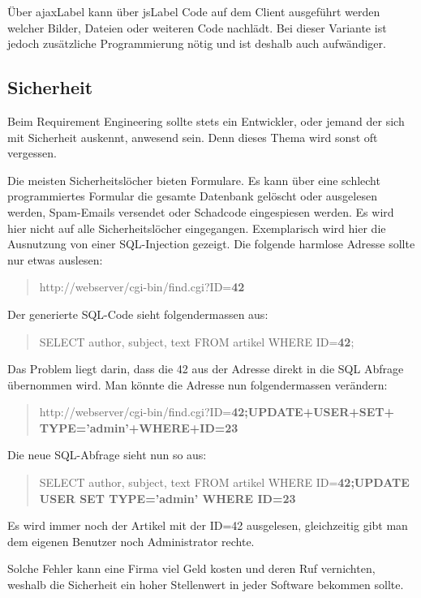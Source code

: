Über \gls{ajaxLabel} kann über \gls{jsLabel} Code auf dem Client ausgeführt werden welcher Bilder, Dateien oder weiteren Code nachlädt. Bei dieser Variante ist jedoch zusätzliche Programmierung nötig und ist deshalb auch aufwändiger. 

\subsection{Sicherheit}
Beim Requirement Engineering sollte stets ein Entwickler, oder jemand der sich mit Sicherheit auskennt, anwesend sein. Denn dieses Thema wird sonst oft vergessen.

Die meisten Sicherheitslöcher bieten Formulare. Es kann über eine schlecht programmiertes Formular die gesamte Datenbank gelöscht oder ausgelesen werden, Spam-Emails versendet oder Schadcode eingespiesen werden.
Es wird hier nicht auf alle Sicherheitslöcher eingegangen. Exemplarisch wird hier die Ausnutzung von einer SQL-Injection gezeigt. Die folgende harmlose Adresse sollte nur etwas auslesen:

\begin{quote}
http://webserver/cgi-bin/find.cgi?ID=\textbf{42}
\end{quote}

Der generierte SQL-Code sieht folgendermassen aus:

\begin{quote}
SELECT author, subject, text FROM artikel WHERE ID=\textbf{42};
\end{quote}

Das Problem liegt darin, dass die 42 aus der Adresse direkt in die SQL Abfrage übernommen wird. Man könnte die Adresse nun folgendermassen verändern:

\begin{quote}
http://webserver/cgi-bin/find.cgi?ID=\textbf{42;UPDATE+USER+SET+\\
TYPE='admin'+WHERE+ID=23}
\end{quote}

Die neue SQL-Abfrage sieht nun so aus:


\begin{quote}
SELECT author, subject, text FROM artikel WHERE ID=\textbf{42;UPDATE USER SET TYPE='admin' WHERE ID=23}
\end{quote}

Es wird immer noch der Artikel mit der ID=42 ausgelesen, gleichzeitig gibt man dem eigenen Benutzer noch Administrator rechte.

Solche Fehler kann eine Firma viel Geld kosten und deren Ruf vernichten, weshalb die Sicherheit ein hoher Stellenwert in jeder Software bekommen sollte.

